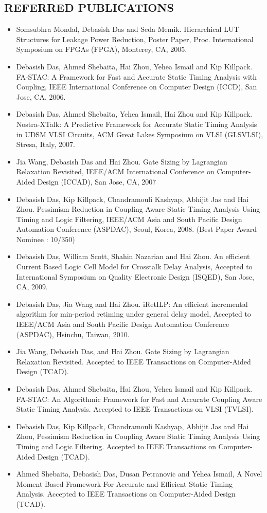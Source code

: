\documentclass[margin]{res}
\begin{document}
\begin{resume}
\section{REFERRED PUBLICATIONS}
\begin{itemize} \itemsep -2pt
\item Somsubhra Mondal, Debasish Das and Seda Memik. Hierarchical LUT Structures for Leakage Power 
  Reduction, Poster Paper, Proc. International Symposium on FPGAs (FPGA), Monterey, CA, 2005.
\item Debasish Das, Ahmed Shebaita, Hai Zhou, Yehea Ismail and Kip Killpack. FA-STAC: A Framework 
  for Fast and Accurate Static Timing Analysis with Coupling, IEEE International Conference on 
  Computer Design (ICCD), San Jose, CA, 2006.
\item Debasish Das, Ahmed Shebaita, Yehea Ismail, Hai Zhou and Kip Killpack. Nostra-XTalk: A Predictive 
  Framework for Accurate Static Timing Analysis in UDSM VLSI Circuits, ACM Great Lakes Symposium on VLSI (GLSVLSI), 
  Stresa, Italy, 2007.
\item Jia Wang, Debasish Das and Hai Zhou. Gate Sizing by Lagrangian Relaxation Revisited, IEEE/ACM 
  International Conference on Computer-Aided Design (ICCAD), San Jose, CA, 2007
\item Debasish Das, Kip Killpack, Chandramouli Kashyap, Abhijit Jas and Hai Zhou. Pessimism Reduction in
  Coupling Aware Static Timing Analysis Using Timing and Logic Filtering, IEEE/ACM Asia and South Pacific 
  Design Automation Conference (ASPDAC), Seoul, Korea, 2008. (Best Paper Award Nominee : 10/350)
\item Debasish Das, William Scott, Shahin Nazarian and Hai Zhou. An efficient Current Based Logic Cell
  Model for Crosstalk Delay Analysis, Accepted to International Symposium on Quality Electronic Design (ISQED), 
  San Jose, CA, 2009.
\item Debasish Das, Jia Wang and Hai Zhou. iRetILP: An efficient incremental algorithm for min-period
  retiming under general delay model, Accepted to IEEE/ACM Asia and South Pacific 
  Design Automation Conference (ASPDAC), Hsinchu, Taiwan, 2010.
\item Jia Wang, Debasish Das, and Hai Zhou. Gate Sizing by Lagrangian Relaxation Revisited. Accepted to
  IEEE Transactions on Computer-Aided Design (TCAD).
\item Debasish Das, Ahmed Shebaita, Hai Zhou, Yehea Ismail and Kip Killpack. FA-STAC: An Algorithmic
  Framework for Fast and Accurate Coupling Aware Static Timing Analysis. Accepted to IEEE
  Transactions on VLSI (TVLSI).
\item Debasish Das, Kip Killpack, Chandramouli Kashyap, Abhijit Jas and Hai Zhou, Pessimism Reduction 
  in Coupling Aware Static Timing Analysis Using Timing and Logic Filtering. Accepted to IEEE 
  Transactions on Computer-Aided Design (TCAD).
\item Ahmed Shebaita, Debasish Das, Dusan Petranovic and Yehea Ismail, A Novel Moment Based Framework For
  Accurate and Efficient Static Timing Analysis. Accepted to IEEE Transactions on Computer-Aided Design (TCAD).
\end{itemize}


\end{resume}
\end{document}
